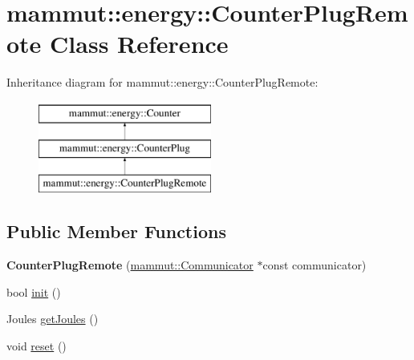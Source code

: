 \hypertarget{classmammut_1_1energy_1_1CounterPlugRemote}{\section{mammut\-:\-:energy\-:\-:Counter\-Plug\-Remote Class Reference}
\label{classmammut_1_1energy_1_1CounterPlugRemote}
}
Inheritance diagram for mammut\-:\-:energy\-:\-:Counter\-Plug\-Remote\-:\begin{figure}[H]
\begin{center}
\leavevmode
\includegraphics[height=3.000000cm]{classmammut_1_1energy_1_1CounterPlugRemote}
\end{center}
\end{figure}
\subsection*{Public Member Functions}
\begin{DoxyCompactItemize}
\item 
\hypertarget{classmammut_1_1energy_1_1CounterPlugRemote_a065a0b1dc8f570567ef674ddeae411b2}{{\bfseries Counter\-Plug\-Remote} (\hyperlink{classmammut_1_1Communicator}{mammut\-::\-Communicator} $\ast$const communicator)}\label{classmammut_1_1energy_1_1CounterPlugRemote_a065a0b1dc8f570567ef674ddeae411b2}

\item 
bool \hyperlink{classmammut_1_1energy_1_1CounterPlugRemote_a2b1b020d6e52ecfcbdd1dadbac76b811}{init} ()
\item 
Joules \hyperlink{classmammut_1_1energy_1_1CounterPlugRemote_abb17aa05e15e07ee8d2da213001147c0}{get\-Joules} ()
\item 
void \hyperlink{classmammut_1_1energy_1_1CounterPlugRemote_ad7436fd2c1d6b860e1bcbea5207f9357}{reset} ()
\end{DoxyCompactItemize}


